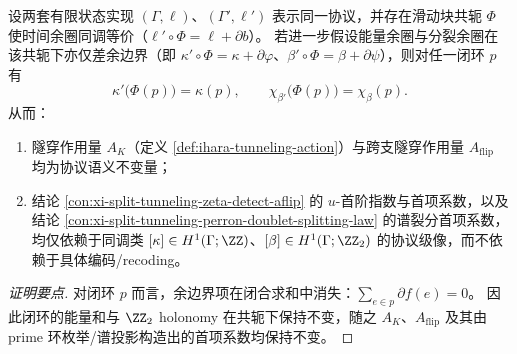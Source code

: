 \begin{conclusion}[余圈同调与滑动块共轭下的分裂隧穿指纹不变性]\label{con:xi-split-tunneling-cohomology-conjugacy-invariance}
设两套有限状态实现 \((\Gamma,\ell)\)、\((\Gamma',\ell')\) 表示同一协议，并存在滑动块共轭 \(\Phi\) 使时间余圈同调等价（\(\ell'\circ\Phi=\ell+\partial b\)）。
若进一步假设能量余圈与分裂余圈在该共轭下亦仅差余边界（即 \(\kappa'\circ\Phi=\kappa+\partial\varphi\)、\(\beta'\circ\Phi=\beta+\partial\psi\)），则对任一闭环 \(p\) 有
\[
\kappa'\!\bigl(\Phi(p)\bigr)=\kappa(p),
\qquad
\chi_{\beta'}\!\bigl(\Phi(p)\bigr)=\chi_{\beta}(p).
\]
从而：
\begin{enumerate}
  \item 隧穿作用量 \(A_K\)（定义 \ref{def:ihara-tunneling-action}）与跨支隧穿作用量 \(A_{\mathrm{flip}}\) 均为协议语义不变量；
  \item 结论 \ref{con:xi-split-tunneling-zeta-detect-aflip} 的 \(u\)-首阶指数与首项系数，以及结论 \ref{con:xi-split-tunneling-perron-doublet-splitting-law} 的谱裂分首项系数，均仅依赖于同调类 \([\kappa]\in H^{1}(\Gamma;\ZZ)\)、\([\beta]\in H^{1}(\Gamma;\ZZ_2)\) 的协议级像，而不依赖于具体编码/recoding。
\end{enumerate}
\end{conclusion}
\begin{proof}[证明要点]
对闭环 \(p\) 而言，余边界项在闭合求和中消失：\(\sum_{e\in p}\partial f(e)=0\)。
因此闭环的能量和与 \(\ZZ_2\) holonomy 在共轭下保持不变，随之 \(A_K\)、\(A_{\mathrm{flip}}\) 及其由 prime 环枚举/谱投影构造出的首项系数均保持不变。
\end{proof}

